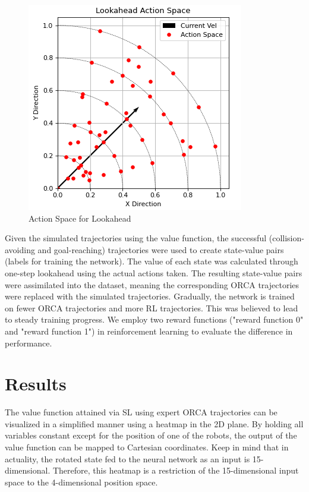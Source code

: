 \documentclass[conference]{IEEEtran}
\begin{document}
\begin{figure}[h!]
    \centering
    \includegraphics[width=0.8\linewidth]{docs/latex/figures/action_space.PNG}
    \caption{Action Space for Lookahead}
    \label{fig:actionspace}
    \vspace{-5mm}
\end{figure}

Given the simulated trajectories using the value function, the successful (collision-avoiding and goal-reaching) trajectories were used to create state-value pairs (labels for training the network). The value of each state was calculated through one-step lookahead using the actual actions taken. The resulting state-value pairs were assimilated into the dataset, meaning the corresponding ORCA trajectories were replaced with the simulated trajectories. Gradually, the network is trained on fewer ORCA trajectories and more RL trajectories. This was believed to lead to steady training progress.
We employ two reward functions ("reward function 0" and "reward function 1") in reinforcement learning to evaluate the difference in performance.

\section{Results}

The value function attained via SL using expert ORCA trajectories can be visualized in a simplified manner using a heatmap in the 2D plane. By holding all variables constant except for the position of one of the robots, the output of the value function can be mapped to Cartesian coordinates. Keep in mind that in actuality, the rotated state fed to the neural network as an input is 15-dimensional. Therefore, this heatmap is a restriction of the 15-dimensional input space to the 4-dimensional position space. 
\end{document}
